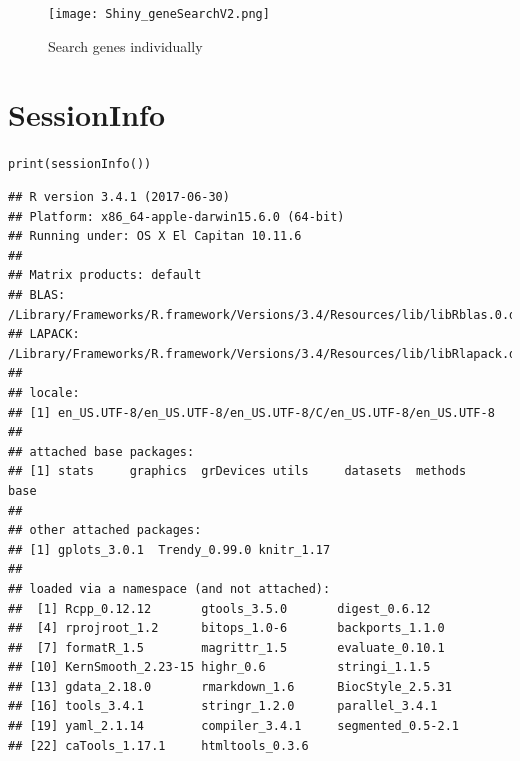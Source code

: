 \documentclass{article}\usepackage[]{graphicx}\usepackage[usenames,dvipsnames]{color}
\newcommand{\hlstd}[1]{\textcolor[rgb]{0.251,0.251,0.251}{#1}}%
\newcommand{\hlkwd}[1]{\textcolor[rgb]{0.878,0.439,0.125}{#1}}%
\newenvironment{knitrout}{}{} %
\begin{document}
\begin{figure}[H]
\centering
\texttt{[image: Shiny\_geneSearchV2.png]}
\caption{Search genes individually}
\end{figure}

\newpage

\section{SessionInfo}

\begin{knitrout}
\color{fgcolor}\begin{kframe}
\begin{alltt}
\hlkwd{print}\hlstd{(}\hlkwd{sessionInfo}\hlstd{())}
\end{alltt}
\begin{verbatim}
## R version 3.4.1 (2017-06-30)
## Platform: x86_64-apple-darwin15.6.0 (64-bit)
## Running under: OS X El Capitan 10.11.6
## 
## Matrix products: default
## BLAS: /Library/Frameworks/R.framework/Versions/3.4/Resources/lib/libRblas.0.dylib
## LAPACK: /Library/Frameworks/R.framework/Versions/3.4/Resources/lib/libRlapack.dylib
## 
## locale:
## [1] en_US.UTF-8/en_US.UTF-8/en_US.UTF-8/C/en_US.UTF-8/en_US.UTF-8
## 
## attached base packages:
## [1] stats     graphics  grDevices utils     datasets  methods   base     
## 
## other attached packages:
## [1] gplots_3.0.1  Trendy_0.99.0 knitr_1.17   
## 
## loaded via a namespace (and not attached):
##  [1] Rcpp_0.12.12       gtools_3.5.0       digest_0.6.12     
##  [4] rprojroot_1.2      bitops_1.0-6       backports_1.1.0   
##  [7] formatR_1.5        magrittr_1.5       evaluate_0.10.1   
## [10] KernSmooth_2.23-15 highr_0.6          stringi_1.1.5     
## [13] gdata_2.18.0       rmarkdown_1.6      BiocStyle_2.5.31  
## [16] tools_3.4.1        stringr_1.2.0      parallel_3.4.1    
## [19] yaml_2.1.14        compiler_3.4.1     segmented_0.5-2.1 
## [22] caTools_1.17.1     htmltools_0.3.6
\end{verbatim}
\end{kframe}
\end{knitrout}
\end{document}
